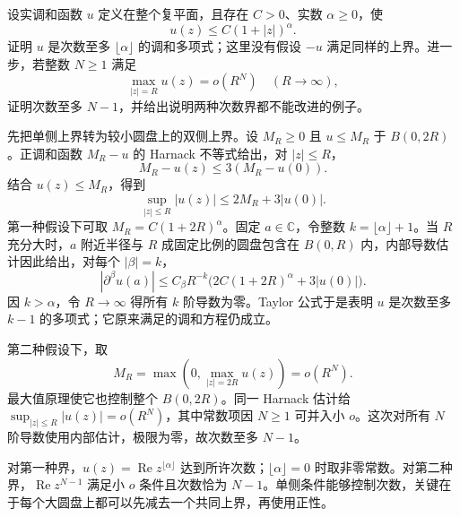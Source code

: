 \begin{exercise}[单侧增长也限制调和函数的次数]\label{b3:ex:15-draft-03}
设实调和函数 \(u\) 定义在整个复平面，且存在 \(C>0\)、实数 \(\alpha\ge0\)，使
\[
 u(z)\le C(1+|z|)^\alpha.
\]
证明 \(u\) 是次数至多 \(\lfloor\alpha\rfloor\) 的调和多项式；这里没有假设 \(-u\) 满足同样的上界。进一步，若整数 \(N\ge1\) 满足
\[
 \max_{|z|=R}u(z)=o(R^N)\quad(R\to\infty),
\]
证明次数至多 \(N-1\)，并给出说明两种次数界都不能改进的例子。
\end{exercise}
\begin{solution}
先把单侧上界转为较小圆盘上的双侧上界。设 \(M_R\ge0\) 且 \(u\le M_R\) 于 \(B(0,2R)\)。正调和函数 \(M_R-u\) 的 Harnack 不等式给出，对 \(|z|\le R\)，
\[
 M_R-u(z)\le3(M_R-u(0)).
\]
结合 \(u(z)\le M_R\)，得到
\[
 \sup_{|z|\le R}|u(z)|\le2M_R+3|u(0)|.
\]
第一种假设下可取 \(M_R=C(1+2R)^\alpha\)。固定 \(a\in\mathbb C\)，令整数 \(k=\lfloor\alpha\rfloor+1\)。当 \(R\) 充分大时，\(a\) 附近半径与 \(R\) 成固定比例的圆盘包含在 \(B(0,R)\) 内，内部导数估计因此给出，对每个 \(|\beta|=k\)，
\[
 |\partial^\beta u(a)|
 \le C_\beta R^{-k}\bigl(2C(1+2R)^\alpha+3|u(0)|\bigr).
\]
因 \(k>\alpha\)，令 \(R\to\infty\) 得所有 \(k\) 阶导数为零。Taylor 公式于是表明 \(u\) 是次数至多 \(k-1\) 的多项式；它原来满足的调和方程仍成立。

第二种假设下，取
\[
 M_R=\max\left(0,\max_{|z|=2R}u(z)\right)=o(R^N).
\]
最大值原理使它也控制整个 \(B(0,2R)\)。同一 Harnack 估计给 \(\sup_{|z|\le R}|u(z)|=o(R^N)\)，其中常数项因 \(N\ge1\) 可并入小 \(o\)。这次对所有 \(N\) 阶导数使用内部估计，极限为零，故次数至多 \(N-1\)。

对第一种界，\(u(z)=\operatorname{Re}z^{\lfloor\alpha\rfloor}\) 达到所许次数；\(\lfloor\alpha\rfloor=0\) 时取非零常数。对第二种界，\(\operatorname{Re}z^{N-1}\) 满足小 \(o\) 条件且次数恰为 \(N-1\)。单侧条件能够控制次数，关键在于每个大圆盘上都可以先减去一个共同上界，再使用正性。
\end{solution}

